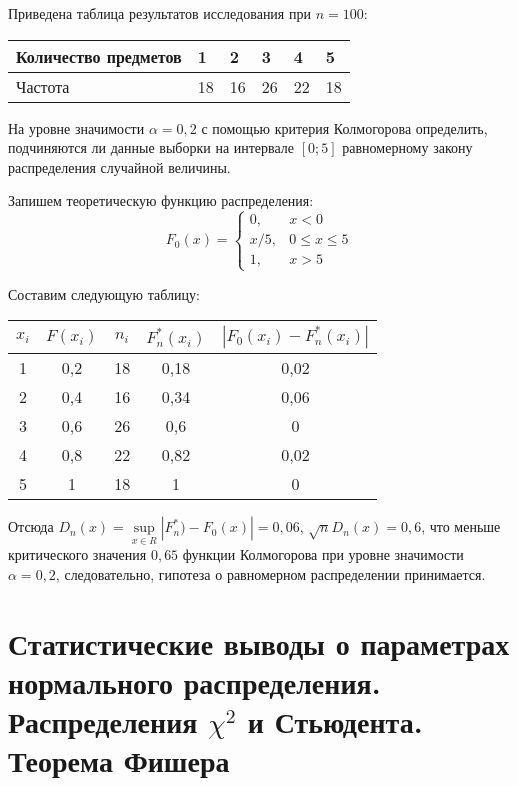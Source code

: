 \begin{exmp}
Приведена таблица результатов исследования при $n=100$:
\begin{center}
    \begin{tabular}{|l|l|l|l|l|l|}
    \hline Количество предметов & 1 & 2 & 3 & 4 & 5 \\
    \hline Частота & 18 & 16 & 26 & 22 & 18 \\
    \hline
\end{tabular}
\end{center}
На уровне значимости $\alpha=0,2$ с помощью критерия Колмогорова определить, подчиняются ли данные выборки на интервале $[0;5]$ равномерному закону распределения случайной величины.

Запишем теоретическую функцию распределения:
\begin{equation*}
    F_{0}(x)=\left\{\begin{array}{cc}
    0, & x<0 \\
    x/5, & 0 \leqslant x \leqslant 5 \\
    1, & x>5
    \end{array}\right.
\end{equation*}

Составим следующую таблицу:
\begin{center}
    \begin{tabular}{|c|c|c|c|c|}
    \hline $x_{i}$ & $F(x_{i})$ & $n_{i}$ & $F^{*}_{n}(x_{i})$ & $|F_{0}(x_{i})-F^{*}_{n}(x_{i})|$ \\
    \hline 1 & 0,2 & 18 & 0,18 & 0,02 \\
    \hline 2 & 0,4 & 16 & 0,34 & 0,06 \\
    \hline 3 & 0,6 & 26 & 0,6 & 0 \\
    \hline 4 & 0,8 & 22 & 0,82 & 0,02 \\
    \hline 5 & 1 & 18 & 1 & 0 \\
\hline
\end{tabular}
\end{center}
Отсюда $D_{n}(x)=\sup\limits_{x \in R}\left|F_{n}^{*})-F_{0}(x)\right| = 0,06$, $\sqrt{n}D_{n}(x) = 0,6$, что меньше критического значения $0,65$ функции Колмогорова при уровне значимости $\alpha=0,2$, следовательно, гипотеза о равномерном распределении принимается.
\end{exmp}

\section{Статистические выводы о параметрах нормального распределения. Распределения $\chi^{2}$ и Стьюдента. Теорема Фишера}

